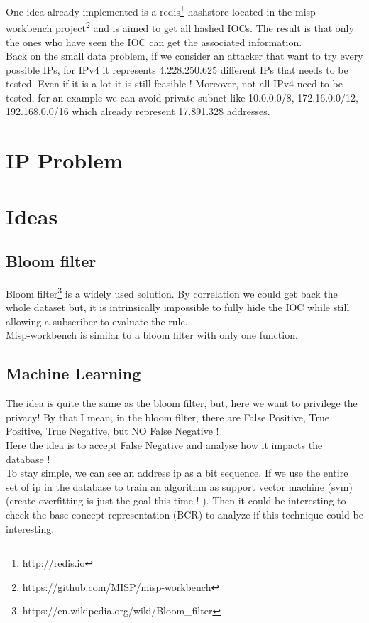 \documentclass[10pt]{article}
\begin{document}
One idea already implemented is a redis\footnote{http://redis.io} hashstore located in the misp workbench project\footnote{https://github.com/MISP/misp-workbench} and is aimed to get all hashed IOCs.
The result is that only the ones who have seen the IOC can get the associated information. \\
Back on the small data problem, if we consider an attacker that want to try every possible IPs, for IPv4 it represents 4.228.250.625 different IPs that needs to be tested. Even if it is a lot it is still feasible ! Moreover, not all IPv4 need to be tested, for an example we can avoid private subnet like 10.0.0.0/8, 172.16.0.0/12, 192.168.0.0/16 which already represent 17.891.328 addresses.

\section{IP Problem}


\section{Ideas}
\subsection{Bloom filter}
Bloom filter\footnote{https://en.wikipedia.org/wiki/Bloom\_filter} is a widely used solution. 
By correlation  we could get back the whole dataset but, it is intrinsically impossible to fully hide the IOC while still allowing a subscriber to evaluate the rule.\\
Misp-workbench is similar to a bloom filter with only one function.

\subsection{Machine Learning}
The idea is quite the same as the bloom filter, but, here we want to privilege the privacy! By that I mean, in the bloom filter, there are False Positive, True Positive, True Negative, but NO False Negative !\\
Here the idea is to accept False Negative and analyse how it impacts the database !\\
To stay simple, we can see an address ip as a bit sequence. If we use the entire set of ip in the database to train an algorithm as support vector machine (svm) (create overfitting is just the goal this time ! ).
Then it could be interesting to check the base concept representation (BCR) to analyze if this technique could be interesting.
\end{document}
